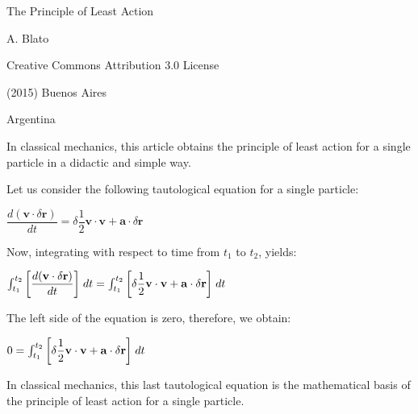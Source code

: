 \documentclass[10pt]{article}
\begin{document}
\begin{center}

{\LARGE The Principle of Least Action}

\bigskip \medskip

{\large A. Blato}

\bigskip \medskip

\small

Creative Commons Attribution 3.0 License

\smallskip

(2015) Buenos Aires

\medskip

Argentina

\smallskip

\bigskip \medskip

\parbox{87.60mm}{In classical mechanics, this article obtains the principle of least action for a single particle in a didactic and simple way.}

\end{center}

\normalsize

\vspace{-1.20em}

\par {}

\bigskip \medskip

\noindent Let us consider the following tautological equation for a single particle:
\par \bigskip \smallskip
\noindent $\dfrac{d(\mathbf{v} \cdot \delta \mathbf{r})}{dt} = \delta \dfrac{1}{2} \mathbf{v} \cdot \mathbf{v} + \mathbf{a} \cdot \delta \mathbf{r}$
\par \bigskip \smallskip
\noindent Now, integrating with respect to time from $t_1$ to $t_2$, yields:
\par \bigskip \smallskip
\noindent $\int_{t_1}^{t_2} \left[ \dfrac{d(\mathbf{v} \cdot \delta \mathbf{r})}{dt} \right] \hspace{+0.12em} dt = \int_{t_1}^{t_2} \left[ \delta \dfrac{1}{2} \mathbf{v} \cdot \mathbf{v} + \mathbf{a} \cdot \delta \mathbf{r} \right] \hspace{+0.12em} dt$
\par \bigskip \smallskip
\noindent The left side of the equation is zero, therefore, we obtain:
\par \bigskip \smallskip
\noindent $0 = \int_{t_1}^{t_2} \left[ \delta \dfrac{1}{2} \mathbf{v} \cdot \mathbf{v} + \mathbf{a} \cdot \delta \mathbf{r} \right] \hspace{+0.12em} dt$
\par \bigskip \smallskip
\noindent In classical mechanics, this last tautological equation is the mathematical basis of the principle of least action for a single particle.
\end{document}
